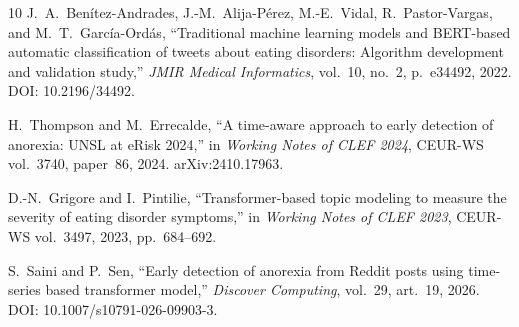 \documentclass[journal]{IEEEtran}
\begin{document}
\begin{thebibliography}{10}
J.~A.~Ben\'itez-Andrades, J.-M.~Alija-P\'erez, M.-E.~Vidal, R.~Pastor-Vargas, and M.~T.~Garc\'ia-Ord\'as, ``Traditional machine learning models and BERT-based automatic classification of tweets about eating disorders: Algorithm development and validation study,'' \emph{JMIR Medical Informatics}, vol.~10, no.~2, p.~e34492, 2022. DOI: 10.2196/34492.

H.~Thompson and M.~Errecalde, ``A time-aware approach to early detection of anorexia: UNSL at eRisk 2024,'' in \emph{Working Notes of CLEF 2024}, CEUR-WS vol.~3740, paper~86, 2024. arXiv:2410.17963.

D.-N.~Grigore and I.~Pintilie, ``Transformer-based topic modeling to measure the severity of eating disorder symptoms,'' in \emph{Working Notes of CLEF 2023}, CEUR-WS vol.~3497, 2023, pp.~684--692.

S.~Saini and P.~Sen, ``Early detection of anorexia from Reddit posts using time-series based transformer model,'' \emph{Discover Computing}, vol.~29, art.~19, 2026. DOI: 10.1007/s10791-026-09903-3.

\end{thebibliography}
\end{document}
